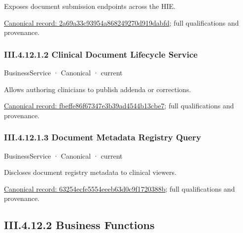 Exposes document submission endpoints across the HIE.


{\footnotesize \href{../../../../continuum/business/business-service/2a69a33c93954a868249270d919dabfd.md}{Canonical record: 2a69a33c93954a868249270d919dabfd}; full qualifications and provenance.}\par
\subsubsection*{III.4.12.1.2 Clinical Document Lifecycle Service}
\label{navigation:III.4.12.1.2}

\label{element:fbeffe86f67347e3b39ad4544b13cbe7}
{\small BusinessService · Canonical · current}\par

Allows authoring clinicians to publish addenda or corrections.


{\footnotesize \href{../../../../continuum/business/business-service/fbeffe86f67347e3b39ad4544b13cbe7.md}{Canonical record: fbeffe86f67347e3b39ad4544b13cbe7}; full qualifications and provenance.}\par
\subsubsection*{III.4.12.1.3 Document Metadata Registry Query}
\label{navigation:III.4.12.1.3}

\label{element:63254ecfe5554eeeb63d0c9f1720388b}
{\small BusinessService · Canonical · current}\par

Discloses document registry metadata to clinical viewers.


{\footnotesize \href{../../../../continuum/business/business-service/63254ecfe5554eeeb63d0c9f1720388b.md}{Canonical record: 63254ecfe5554eeeb63d0c9f1720388b}; full qualifications and provenance.}\par
\subsection*{III.4.12.2 Business Functions}
\label{navigation:III.4.12.2}

